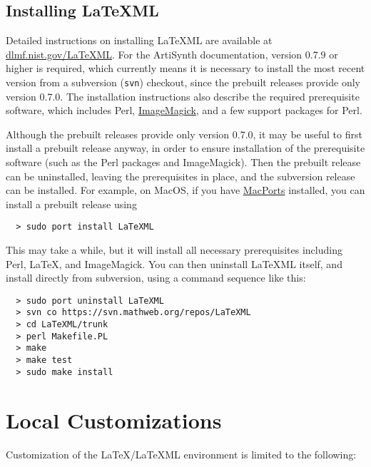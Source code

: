 \documentclass{article}
\begin{document}
\subsection{Installing LaTeXML}

Detailed instructions on installing LaTeXML are available at
\href{http://dlmf.nist.gov/LaTeXML/}{dlmf.nist.gov/LaTeXML}.  For the
ArtiSynth documentation, version 0.7.9 or higher is required, which
currently means it is necessary to install the most recent version
from a subversion ({\tt svn}) checkout, since the prebuilt releases
provide only version 0.7.0. The installation instructions also
describe the required prerequisite software, which includes Perl,
\href{http://www.imagemagick.org}{ImageMagick}, and a few support
packages for Perl.

Although the prebuilt releases provide only version 0.7.0, it may be
useful to first install a prebuilt release anyway, in order to ensure
installation of the prerequisite software (such as the Perl packages
and ImageMagick). Then the prebuilt release can be uninstalled,
leaving the prerequisites in place, and the subversion release can be
installed. For example, on MacOS, if you have 
\href{http://www.macports.org}{MacPorts} installed, 
you can install a prebuilt release
using 

\begin{lstlisting}
  > sudo port install LaTeXML
\end{lstlisting}

This may take a while, but it will install all necessary prerequisites
including Perl, LaTeX, and ImageMagick. You can then uninstall LaTeXML
itself, and install directly from subversion, using a command
sequence like this:

\begin{lstlisting}
  > sudo port uninstall LaTeXML
  > svn co https://svn.mathweb.org/repos/LaTeXML
  > cd LaTeXML/trunk
  > perl Makefile.PL
  > make
  > make test
  > sudo make install
\end{lstlisting}

\section{Local Customizations}
\label{LocalCustomizationSec}

Customization of the LaTeX/LaTeXML environment is limited to the
following:
\end{document}
